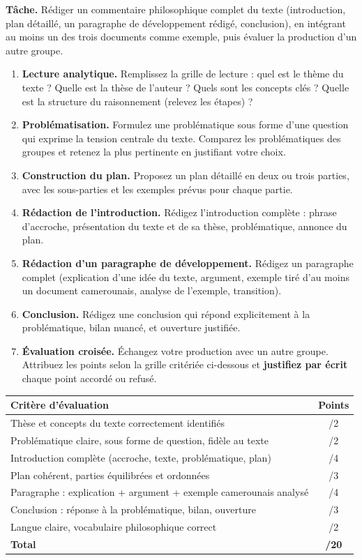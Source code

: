 \documentclass[11pt]{article}
\newcounter{popsec}
\newcounter{popsub}
\newcommand{\courssub}[1]{%
  \stepcounter{popsub}%
  \par\vspace{9pt}\noindent{\popxbold\fontsize{11.5}{13}\selectfont\color{popink}{\color{poporange}\thepopsec.\thepopsub}\hspace{6pt}#1}\par\nopagebreak\vspace{4pt}
}
\begin{document}
\textbf{Tâche.} Rédiger un commentaire philosophique complet du texte (introduction, plan détaillé, un paragraphe de développement rédigé, conclusion), en intégrant au moins un des trois documents comme exemple, puis évaluer la production d'un autre groupe.

\courssub{Consignes}

\begin{enumerate}
\item \textbf{Lecture analytique.} Remplissez la grille de lecture : quel est le thème du texte ? Quelle est la thèse de l'auteur ? Quels sont les concepts clés ? Quelle est la structure du raisonnement (relevez les étapes) ?
\item \textbf{Problématisation.} Formulez une problématique sous forme d'une question qui exprime la tension centrale du texte. Comparez les problématiques des groupes et retenez la plus pertinente en justifiant votre choix.
\item \textbf{Construction du plan.} Proposez un plan détaillé en deux ou trois parties, avec les sous-parties et les exemples prévus pour chaque partie.
\item \textbf{Rédaction de l'introduction.} Rédigez l'introduction complète : phrase d'accroche, présentation du texte et de sa thèse, problématique, annonce du plan.
\item \textbf{Rédaction d'un paragraphe de développement.} Rédigez un paragraphe complet (explication d'une idée du texte, argument, exemple tiré d'au moins un document camerounais, analyse de l'exemple, transition).
\item \textbf{Conclusion.} Rédigez une conclusion qui répond explicitement à la problématique, bilan nuancé, et ouverture justifiée.
\item \textbf{Évaluation croisée.} Échangez votre production avec un autre groupe. Attribuez les points selon la grille critériée ci-dessous et \textbf{justifiez par écrit} chaque point accordé ou refusé.
\end{enumerate}

\begin{center}
\begin{tabularx}{\linewidth}{|X|c|}
\hline
\rowcolor{popblueL} \textbf{Critère d'évaluation} & \textbf{Points} \\
\hline
Thèse et concepts du texte correctement identifiés & /2 \\
\hline
Problématique claire, sous forme de question, fidèle au texte & /2 \\
\hline
Introduction complète (accroche, texte, problématique, plan) & /4 \\
\hline
Plan cohérent, parties équilibrées et ordonnées & /3 \\
\hline
Paragraphe : explication + argument + exemple camerounais analysé & /4 \\
\hline
Conclusion : réponse à la problématique, bilan, ouverture & /3 \\
\hline
Langue claire, vocabulaire philosophique correct & /2 \\
\hline
\textbf{Total} & \textbf{/20} \\
\hline
\end{tabularx}
\end{center}
\end{document}
